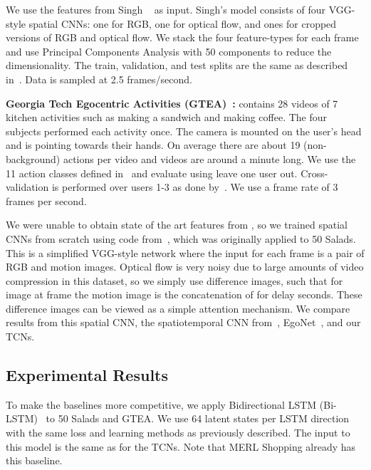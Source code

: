 \documentclass[10pt,twocolumn,letterpaper]{article}
\newcommand{\fakesubsection}[1]{\smallskip\noindent\textbf{#1:}}
\begin{document}
We use the features from Singh \etal~\cite{singh_cvpr_2016_merl} as input. Singh's model consists of four VGG-style spatial CNNs: one for RGB, one for optical flow, and ones for cropped versions of RGB and optical flow. We stack the four feature-types for each frame and use Principal Components Analysis with 50 components to reduce the dimensionality.
The train, validation, and test splits are the same as described in~\cite{singh_cvpr_2016_merl}.
Data is sampled at 2.5 frames/second.

\fakesubsection{Georgia Tech Egocentric Activities (GTEA)~\cite{fathi_cvpr_2011}}
contains 28 videos of 7 kitchen activities such as making a sandwich and making coffee. The four subjects performed each activity once.
The camera is mounted on the user's head and is pointing towards their hands.
On average there are about 19 (non-background) actions per video and videos are around a minute long. We use the 11 action classes defined in~\cite{fathi_iccv_2011} and evaluate using leave one user out. Cross-validation is performed over users 1-3 as done by~\cite{singh_cvpr_2016_ego}. 
We use a frame rate of 3 frames per second.


We were unable to obtain state of the art features from \cite{singh_cvpr_2016_ego}, so 
we trained spatial CNNs from scratch using code from~\cite{lea_eccv_2016}, which was originally applied to 50 Salads. 
This is a simplified VGG-style network where the input for each frame is a pair of RGB and motion images. 
Optical flow is very noisy due to large amounts of video compression in this dataset, so we simply use difference images, such that for image  at frame  the motion image is the concatenation of  for delay  seconds. 
These difference images can be viewed as a simple attention mechanism.
We compare results from this spatial CNN, the spatiotemporal CNN from~\cite{lea_eccv_2016}, EgoNet~\cite{singh_cvpr_2016_ego}, and our TCNs. 

\subsection{Experimental Results}
\label{sec:experiments}

To make the baselines more competitive, we apply Bidirectional LSTM (Bi-LSTM)~\cite{bi_lstm} to 50 Salads and GTEA. We use 64 latent states per LSTM direction with the same loss and learning methods as previously described. The input to this model is the same as for the TCNs. Note that MERL Shopping already has this baseline. 
\end{document}
